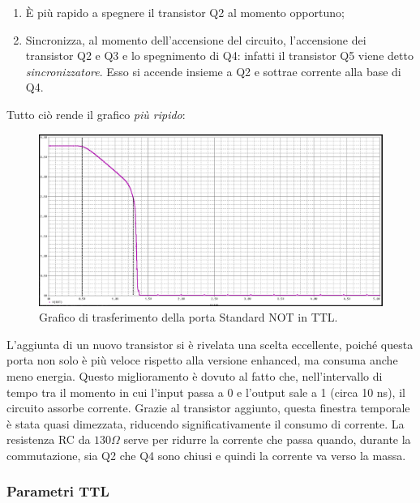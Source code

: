 \documentclass[
]{book}
\providecommand{\tightlist}{%
  \setlength{\itemsep}{0pt}\setlength{\parskip}{0pt}}
\begin{document}
\begin{enumerate}
\def\labelenumi{\arabic{enumi})}
\tightlist
\item
  È più rapido a spegnere il transistor Q2 al momento opportuno;
\item
  Sincronizza, al momento dell'accensione del circuito, l'accensione dei
  transistor Q2 e Q3 e lo spegnimento di Q4: infatti il transistor Q5
  viene detto \emph{sincronizzatore}. Esso si accende insieme a Q2 e
  sottrae corrente alla base di Q4.
\end{enumerate}

Tutto ciò rende il grafico \emph{più ripido}:

\begin{figure}
\centering
\includegraphics[width=0.6\linewidth,height=\textheight,keepaspectratio]{assets/imgs/standard_not.png}
\caption{Grafico di trasferimento della porta Standard NOT in TTL.}
\end{figure}

L'aggiunta di un nuovo transistor si è rivelata una scelta eccellente,
poiché questa porta non solo è più veloce rispetto alla versione
enhanced, ma consuma anche meno energia. Questo miglioramento è dovuto
al fatto che, nell'intervallo di tempo tra il momento in cui l'input
passa a 0 e l'output sale a 1 (circa 10 ns), il circuito assorbe
corrente. Grazie al transistor aggiunto, questa finestra temporale è
stata quasi dimezzata, riducendo significativamente il consumo di
corrente. La resistenza RC da \(130\Omega\) serve per ridurre la
corrente che passa quando, durante la commutazione, sia Q2 che Q4 sono
chiusi e quindi la corrente va verso la massa.

\subsubsection{Parametri TTL}\label{parametri-ttl}
\end{document}
